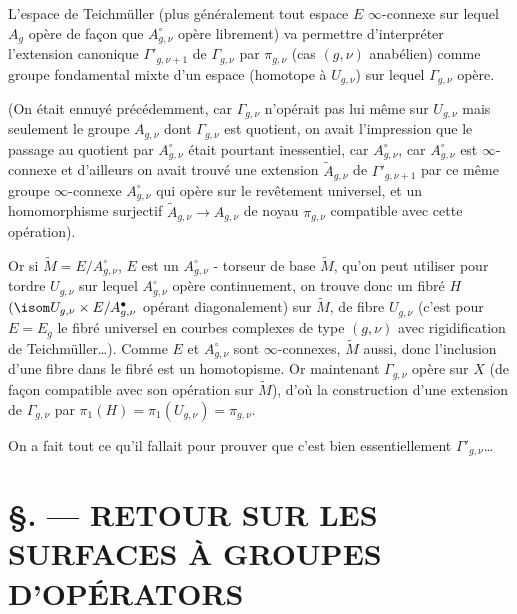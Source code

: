 L'espace de Teichmüller (plus généralement tout espace $E$ $\infty$-connexe sur lequel $A_g$ opère de fa\c{c}on que $A^\circ_{g, \nu}$ opère librement) va permettre d'interpréter l'extension canonique $\Gamma'_{g, \nu + 1}$ de $\Gamma_{g, \nu}$ par $\pi_{g, \nu}$ (cas $(g, \nu)$ anabélien) comme groupe fondamental mixte d'un espace (homotope à $U_{g, \nu}$) sur lequel $\Gamma_{g, \nu}$ opère.

(On était ennuyé précédemment, car $\Gamma_{g, \nu}$ n'opérait pas lui même sur $U_{g, \nu}$ mais seulement le groupe $A_{g, \nu}$ dont $\Gamma_{g, \nu}$ est quotient, on avait l'impression que le passage au quotient par $A^\circ_{g, \nu}$ était pourtant inessentiel, car $A^\circ_{g, \nu}$, car $A^\circ_{g, \nu}$ est $\infty$-connexe et d'ailleurs on avait trouvé une extension $\widetilde{A}_{g, \nu}$ de $\Gamma'_{g, \nu + 1}$ par ce même groupe $\infty$-connexe $A^\circ_{g, \nu}$ qui opère sur le revêtement universel, et un homomorphisme surjectif $\widetilde{A}_{g, \nu} \to A_{g, \nu}$ de noyau $\pi_{g, \nu}$ compatible avec cette opération).

Or si $\widetilde{M} = E/A^\circ_{g, \nu}$, $E$ est un $A^\circ_{g, \nu}$ - torseur de base $\widetilde{M}$, qu'on peut utiliser pour tordre $U_{g, \nu}$ sur lequel $A^\circ_{g, \nu}$ opère continuement, on trouve donc un fibré $H$ $(\isom U_{g, \nu} \times E/A^\bullet_{g, \nu}$ opérant diagonalement) sur $\widetilde{M}$, de fibre $U_{g, \nu}$ (c'est pour $E = E_g$ le fibré universel en courbes complexes de type $(g, \nu)$ avec rigidification de Teichmüller\dots). Comme $E$ et $A^\circ_{g, \nu}$ sont $\infty$-connexes, $\widetilde{M}$ aussi, donc l'inclusion d'une fibre dans le fibré est un homotopisme. Or maintenant $\Gamma_{g, \nu}$ opère sur $X$ (de fa\c{c}on compatible avec son opération sur $\widetilde{M}$), d'où la construction d'une extension de $\Gamma_{g, \nu}$ par $\pi_1(H) = \pi_1(U_{g, \nu}) = \pi_{g, \nu}$.

On a fait tout ce qu'il fallait pour prouver que c'est bien essentiellement $\Gamma'_{g, \nu}$\dots








\chapter*{\S {}. --- RETOUR SUR LES SURFACES À GROUPES D'OPÉRATORS}\thispagestyle{empty}
\label{sec:23}
